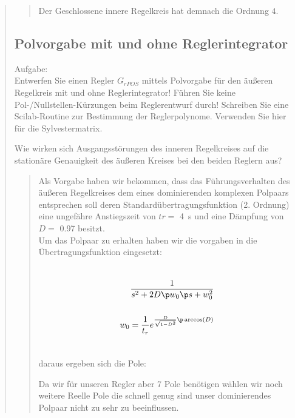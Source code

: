 \begin{quote}
\begin{quote}
        Der Geschlossene innere Regelkreis hat demnach die Ordnung $4$.
        
    \end{quote}  %
    
    \subsection{Polvorgabe mit und ohne Reglerintegrator}
    Aufgabe:\\
    Entwerfen Sie einen Regler $G_{rPOS}$ mittels Polvorgabe für den äußeren Regelkreis mit und ohne Reglerintegrator!
    Führen Sie keine Pol-/Nullstellen-Kürzungen beim Reglerentwurf durch! Schreiben Sie eine Scilab-Routine zur
    Bestimmung der Reglerpolynome. Verwenden Sie hier für die Sylvestermatrix.\vspace{1em}
    
    Wie wirken sich Ausgangsstörungen des inneren Regelkreises auf die stationäre Genauigkeit des äußeren Kreises bei
    den beiden Reglern aus?
    \begin{quote}
        
        Als Vorgabe haben wir bekommen, dass das Führungsverhalten des äußeren Regelkreises dem eines dominierenden komplexen
        Polpaars entsprechen soll deren Standardübertragungsfunktion (2. Ordnung) eine ungefähre Anstiegszeit von $tr =$
        \SI{4}{\second} und eine Dämpfung von $D =$ \SI{0,97}{} besitzt.\\
        Um das Polpaar zu erhalten haben wir die vorgaben in die Übertragungsfunktion eingesetzt:
        
        
        \begin{equation*}
            \begin{split}
                \\
                \frac{1}{s^2 + 2 D \p w_0 \p s + w_0^2}\\
                \\
                w_0 = \frac{1}{t_r} e^{ \frac{D}{\sqrt{1-D^2}} \p \arccos(D) }\\
                \\
            \end{split}
        \end{equation*}
        
        daraus ergeben sich die Pole:
        
        Da wir für unseren Regler aber 7 Pole benötigen wählen wir noch weitere Reelle Pole die schnell genug sind unser
        dominierendes Polpaar nicht zu sehr zu beeinflussen.
        

\end{quote}
\end{quote}
